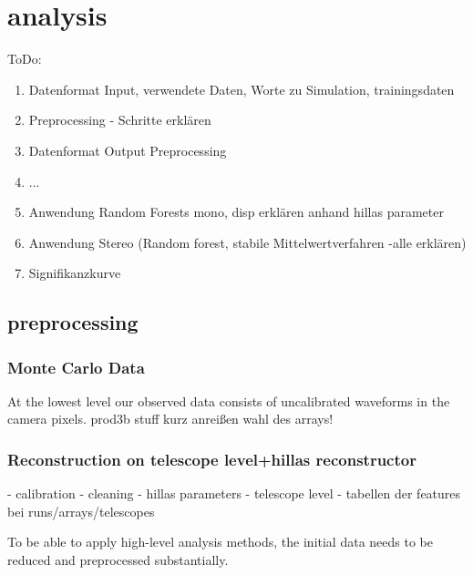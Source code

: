 \chapter{analysis}\label{analysis}

ToDo:
\begin{enumerate}[nosep]
    \item Datenformat Input, verwendete Daten, Worte zu Simulation, trainingsdaten
    \item Preprocessing - Schritte erklären
    \item Datenformat Output Preprocessing
    \item ...
    \item Anwendung Random Forests mono, disp erklären anhand hillas parameter
    \item Anwendung Stereo (Random forest, stabile Mittelwertverfahren -alle erklären)
    \item Signifikanzkurve
\end{enumerate}

\section{preprocessing}

\subsection{Monte Carlo Data}
At the lowest level our observed data consists of uncalibrated waveforms 
in the camera pixels.
prod3b stuff kurz anreißen
wahl des arrays!

\subsection{Reconstruction on telescope level+hillas reconstructor}
- calibration
- cleaning
- hillas parameters 
- telescope level
- tabellen der features bei runs/arrays/telescopes

To be able to apply high-level analysis methods, the initial data 
needs to be reduced and preprocessed substantially.

